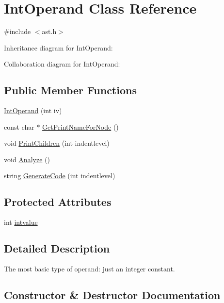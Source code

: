\hypertarget{class_int_operand}{}\section{Int\+Operand Class Reference}
\label{class_int_operand}


{\ttfamily \#include $<$ast.\+h$>$}



Inheritance diagram for Int\+Operand\+:


Collaboration diagram for Int\+Operand\+:
\subsection*{Public Member Functions}
\begin{DoxyCompactItemize}
\item 
\hyperlink{class_int_operand_ab17cc1b327ea4112715a5ff1f331835d}{Int\+Operand} (int iv)
\item 
const char $\ast$ \hyperlink{class_int_operand_ab81268dfb4d2a7823ab860c5d9d9dc65}{Get\+Print\+Name\+For\+Node} ()
\item 
void \hyperlink{class_int_operand_ac3a3845a17a1eb9a2c1e3ff631b8a400}{Print\+Children} (int indentlevel)
\item 
void \hyperlink{class_int_operand_ac509fc25d25b9a69b63ddbdf54f5a353}{Analyze} ()
\item 
string \hyperlink{class_int_operand_aeaaef4fc5e36f9154dbe66c6b3f471e6}{Generate\+Code} (int indentlevel)
\end{DoxyCompactItemize}
\subsection*{Protected Attributes}
\begin{DoxyCompactItemize}
\item 
int \hyperlink{class_int_operand_ac63d408480b2e50d99d1b239a8466d1a}{intvalue}
\end{DoxyCompactItemize}


\subsection{Detailed Description}
The most basic type of operand\+: just an integer constant. 

\subsection{Constructor \& Destructor Documentation}
\mbox{\label{class_int_operand_ab17cc1b327ea4112715a5ff1f331835d}} 
